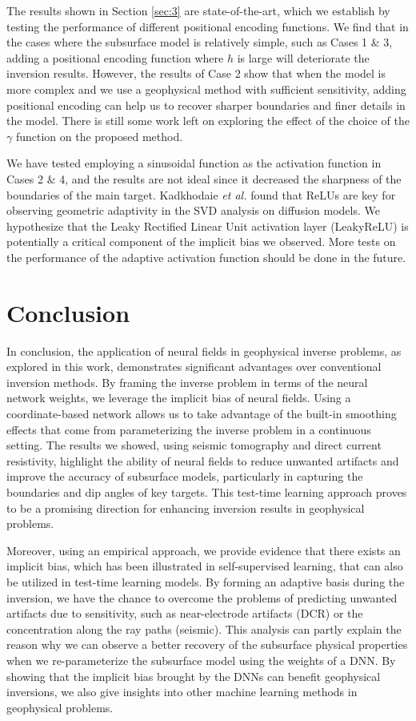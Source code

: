 \documentclass[lettersize,journal]{IEEEtran}
\begin{document}
The results shown in Section \ref{sec:3} are state-of-the-art, which we establish by testing the performance of different positional encoding functions. We find that in the cases where the subsurface model is relatively simple, such as Cases 1 $\&$ 3, adding a positional encoding function where $h$ is large will deteriorate the inversion results. However, the results of Case 2 show that when the model is more complex and we use a geophysical method with sufficient sensitivity, adding positional encoding can help us to recover sharper boundaries and finer details in the model. There is still some work left on exploring the effect of the choice of the $\gamma$ function on the proposed method.  

We have tested employing a sinusoidal function \cite{SIREN} as the activation function in Cases 2 $\&$ 4, and the results are not ideal since it decreased the sharpness of the boundaries of the main target. Kadkhodaie \textit{et al.} \cite{Zahra} found that ReLUs are key for observing geometric adaptivity in the SVD analysis on diffusion models. We hypothesize that the Leaky Rectified Linear Unit activation layer (LeakyReLU) is potentially a critical component of the implicit bias we observed. More tests on the performance of the adaptive activation function should be done in the future.
 
\section{Conclusion}

In conclusion, the application of neural fields in geophysical inverse problems, as explored in this work, demonstrates significant advantages over conventional inversion methods. By framing the inverse problem in terms of the neural network weights, we leverage the implicit bias of neural fields. Using a coordinate-based network allows us to take advantage of the built-in smoothing effects that come from parameterizing the inverse problem in a continuous setting. The results we showed, using seismic tomography and direct current resistivity, highlight the ability of neural fields to reduce unwanted artifacts and improve the accuracy of subsurface models, particularly in capturing the boundaries and dip angles of key targets. This test-time learning approach proves to be a promising direction for enhancing inversion results in geophysical problems.

Moreover, using an empirical approach, we provide evidence that there exists an implicit bias, which has been illustrated in self-supervised learning, that can also be utilized in test-time learning models. By forming an adaptive basis during the inversion, we have the chance to overcome the problems of predicting unwanted artifacts due to sensitivity, such as near-electrode artifacts (DCR) or the concentration along the ray paths (seismic). This analysis can partly explain the reason why we can observe a better recovery of the subsurface physical properties when we re-parameterize the subsurface model using the weights of a DNN. By showing that the implicit bias brought by the DNNs can benefit geophysical inversions, we also give insights into other machine learning methods in geophysical problems.
\end{document}
